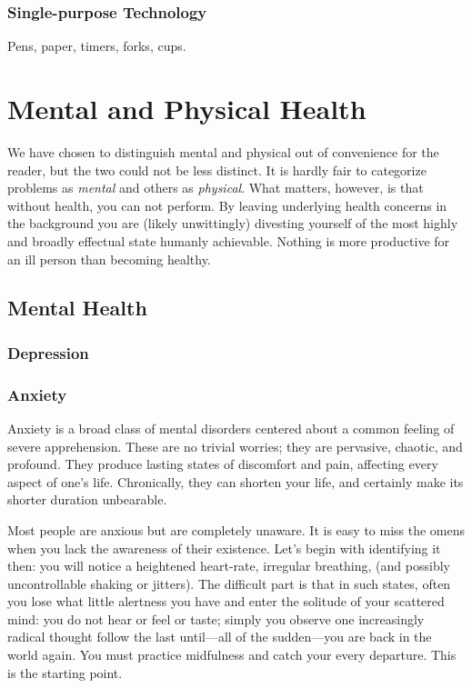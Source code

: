 \documentclass{book}
\numberwithin{equation}{section}
\begin{document}
\subsection{Single-purpose Technology}
Pens, paper, timers, forks, cups.


\chapter{Mental and Physical Health}
We have chosen to distinguish mental and physical out of convenience for the reader, but the two could not be less distinct. It is hardly fair to categorize problems as \emph{mental} and others as \emph{physical}. What matters, however, is that without health, you can not perform. By leaving underlying health concerns in the background you are (likely unwittingly) divesting yourself of the most highly and broadly effectual state humanly achievable. Nothing is more productive for an ill person than becoming healthy.  
\section{Mental Health}
\subsection{Depression}
\subsection{Anxiety}
Anxiety is a broad class of mental disorders centered about a common feeling of severe apprehension. These are no trivial worries; they are pervasive, chaotic, and profound. They produce lasting states of discomfort and pain, affecting every aspect of one's life. Chronically, they can shorten your life, and certainly make its shorter duration unbearable. 

Most people are anxious but are completely unaware. It is easy to miss the omens when you lack the awareness of their existence. Let's begin with identifying it then: you will notice a heightened heart-rate, irregular breathing, (and possibly uncontrollable shaking or jitters). The difficult part is that in such states, often you lose what little alertness you have and enter the solitude of your scattered mind: you do not hear or feel or taste; simply you observe one increasingly radical thought follow the last until---all of the sudden---you are back in the world again. You must practice midfulness and catch your every departure. This is the starting point.
\end{document}
